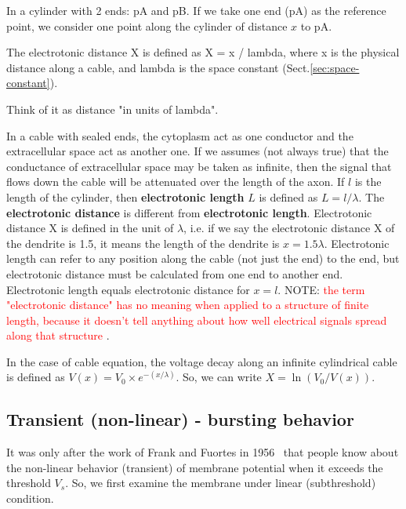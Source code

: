 In a cylinder with 2 ends: pA and pB. If we take one end (pA) as the reference
point, we consider one point along the cylinder of distance $x$ to pA.

The electrotonic distance X is defined as X = x / lambda, where x is the
physical distance along a cable, and lambda is the space constant
(Sect.\ref{sec:space-constant}).

Think of it as distance "in units of lambda".


\begin{framed}

In a cable with sealed ends, the cytoplasm act as one conductor and the
extracellular space act as another one. If we assumes (not always true) that the
conductance of extracellular space may be taken as infinite, then the signal
that flows down the cable will be attenuated over the length of the axon. If $l$
is the length of the cylinder, then {\bf electrotonic length} $L$ is defined as
$L=l/\lambda$. The {\bf electrotonic distance} is different from {\bf
electrotonic length}. Electrotonic distance X is defined in the unit of
$\lambda$, i.e. if we say the electrotonic distance X of the dendrite is 1.5, it
means the length of the dendrite is $x=1.5\lambda$. Electrotonic length can
refer to any position along the cable (not just the end) to the end, but
electrotonic distance must be calculated from one end to another end.
Electrotonic length equals electrotonic distance for $x=l$. NOTE:
\textcolor{red}{the term "electrotonic distance" has no meaning when applied to
a structure of finite length, because it doesn't tell anything about how well
electrical signals spread along that structure} \citep{johnston1994fcn}.

In the case of cable equation, the voltage decay along an infinite cylindrical
cable is defined as $V(x) = V_0 \times e^{-(x/\lambda)}$. So, we can write
$X=\ln \left(V_0/V(x)\right)$. 
\end{framed}

\subsection{Transient (non-linear) - bursting behavior}
\label{sec:transient-non-linear}
\label{sec:electrotonus_vs_transient}
\label{sec:bursting_behavior}

It was only after the work of Frank and Fuortes in 1956~\citep{frank1956ssm}
that people know about the non-linear behavior (transient) of membrane potential
when it exceeds the threshold $V_s$. So, we first examine the membrane under
linear (subthreshold) condition.

